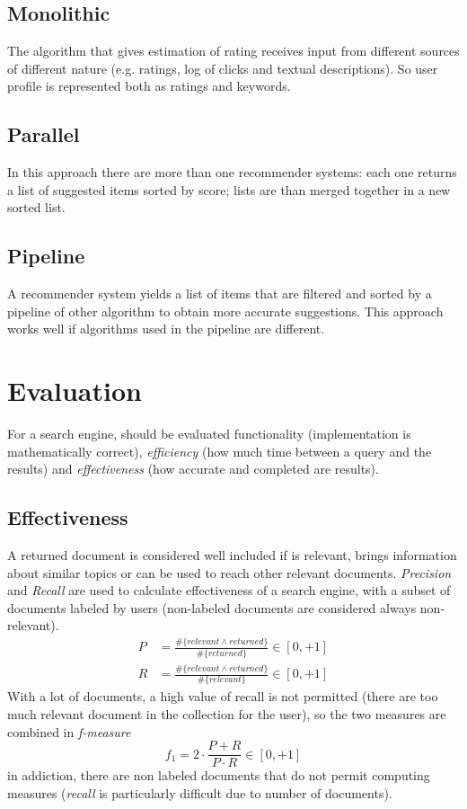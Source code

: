 \documentclass[11pt, a4page]{article}
\begin{document}
\subsection{Monolithic}
The algorithm that gives estimation of rating receives input from different sources of different nature (e.g. ratings, log of clicks and textual descriptions).
So user profile is represented both as ratings and keywords.

\subsection{Parallel}
In this approach there are more than one recommender systems: each one returns a list of suggested items sorted by score; lists are than merged together in a new sorted list.

\subsection{Pipeline}
A recommender system yields a list of items that are filtered and sorted by a pipeline of other algorithm to obtain more accurate suggestions.
This approach works well if algorithms used in the pipeline are different.

\section{Evaluation}
For a search engine, should be evaluated functionality (implementation is mathematically correct), \textit{efficiency} (how much time between a query and the results) and \textit{effectiveness} (how accurate and completed are results).

\subsection{Effectiveness}
A returned document is considered well included if is relevant, brings information about similar topics or can be used to reach other relevant documents.
\textit{Precision} and \textit{Recall} are used to calculate effectiveness of a search engine, with a subset of documents labeled by users (non-labeled documents are considered always non-relevant).
\begin{align*}
  P &= \frac{\# \{relevant \wedge returned\}}{\#\{returned\}} \in [0, +1] \\
  R &= \frac{\# \{relevant \wedge returned\}}{\#\{relevant\}} \in [0, +1]
\end{align*}
With a lot of documents, a high value of recall is not permitted (there are too much relevant document in the collection for the user), so the two measures are combined in \textit{f-measure}
\begin{equation*}
  f_1 = 2 \cdot \frac{P + R}{P \cdot R} \in [0, +1]
\end{equation*}
in addiction, there are non labeled documents that do not permit computing measures (\textit{recall} is particularly difficult due to number of documents).
\end{document}

